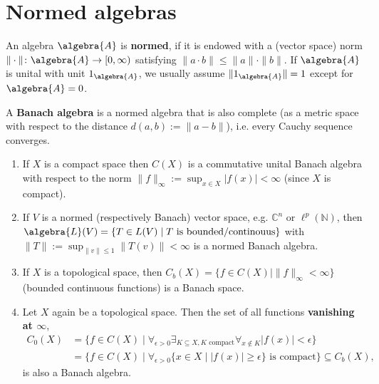\documentclass[a4paper]{article}
\begin{document}
\section{Normed algebras}

\begin{definition}
	An algebra $\algebra{A}$ is \textbf{normed}, if it is endowed with a (vector space) norm $\| \cdot \| \colon \algebra{A} \to [0, \infty)$ satisfying $\|a \cdot b\| \leq \|a\| \cdot \|b\|$.
	If $\algebra{A}$ is unital with unit $1_\algebra{A}$, we usually assume $\| 1_\algebra{A} \| = 1$ except for $\algebra{A} = 0$.
\end{definition}

\begin{definition}
	A \textbf{Banach algebra} is a normed algebra that is also complete (as a metric space with respect to the distance $d(a,b) := \| a - b\|$), i.e. every Cauchy sequence converges.

\end{definition}

\begin{example}
	\begin{enumerate}
		\item If $X$ is a compact space then $C(X)$ is a commutative unital Banach algebra with respect to the norm $\| f \|_\infty := \sup_{x \in X} |f(x)| < \infty$ (since $X$ is compact).
		\item If $V$ is a normed (respectively Banach) vector space, e.g. $\mathds{C}^n$ or $\ell^p(\mathds{N})$, then $\algebra{L}(V) = \{T \in L(V) \mid T \text{ is bounded/continouus} \}$ with $\|T\| := \sup_{\|v\| \leq 1} \| T(v) \| < \infty$ is a normed Banach algebra.
		\item If $X$ is a topological space, then $C_b(X) = \{f \in C(X) \mid \|f\|_\infty < \infty \}$ (bounded continuous functions) is a Banach space.
		\item Let $X$ again be a topological space. Then the set of all functions \textbf{vanishing at $\infty$},
		      \begin{align*}
			      C_0(X) & = \{ f \in C(X) \mid \forall_{\epsilon > 0} \exists_{K \subseteq X, K \text{ compact}} \forall_{x \notin K} |f(x)| < \epsilon \} \\
			             & = \{ f \in C(X) \mid \forall_{\epsilon > 0} \{x \in X \mid |f(x)| \geq \epsilon \} \text{ is compact} \}
			      \subseteq C_b(X)
			      \text{,}
		      \end{align*}
		      is also a Banach algebra.
	\end{enumerate}
\end{example}
\end{document}
